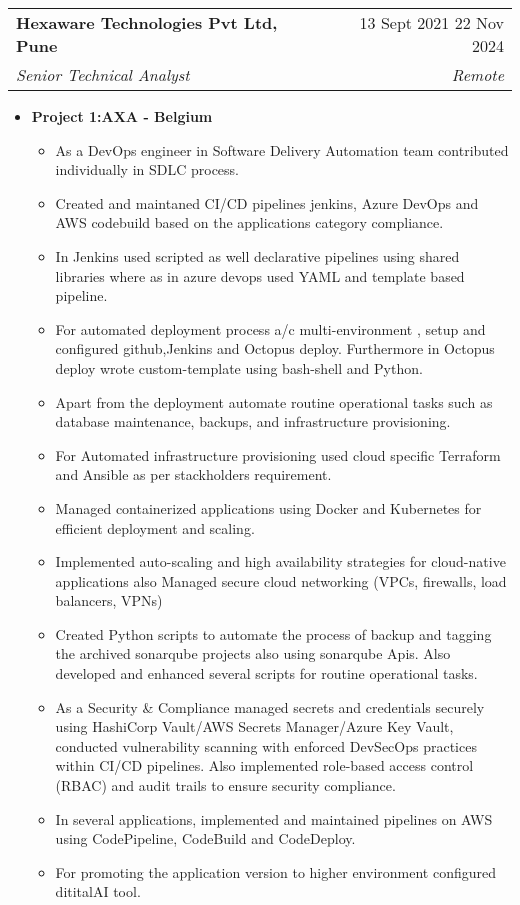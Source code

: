 \documentclass[letterpaper, 11pt]{article}
\makeatletter
\newcommand{\resumeSubheading}[4]{
  \vspace{-2pt}\item
    \begin{tabular*}{0.99\textwidth}[t]{l@{\extracolsep{\fill}}r}
      \textbf{#1} & #2 \\
      \textit{\small#3} & \textit{\small #4} \\
    \end{tabular*}\vspace{-7pt}
}
\newcommand{\resumeItemListStart}{\begin{itemize}[leftmargin=0.25in, label={\textbullet}]}
\newcommand{\resumeItemListEnd}{\end{itemize}\vspace{-10pt}}
\makeatother
\begin{document}
    \resumeSubheading{Hexaware Technologies Pvt Ltd, Pune}{ 13 Sept 2021 \textendash{} 22 Nov 2024}
        {Senior Technical Analyst }{Remote}
        \resumeItemListStart{}
            \item[] \textbf{Project 1:AXA - Belgium}
            \begin{itemize}[leftmargin=0.5in, label={\textbullet}]
                \item As a DevOps engineer in Software Delivery Automation team contributed individually in SDLC process.
                \item Created and maintaned CI/CD pipelines jenkins, Azure DevOps and AWS codebuild based on the applications category compliance.
                \item In Jenkins used scripted as well declarative pipelines using shared libraries where as in azure devops used YAML and template
                 based pipeline.
                \item For automated deployment process a/c multi-environment , setup and configured github,Jenkins and Octopus deploy. Furthermore 
                in Octopus deploy wrote custom-template using bash-shell and  Python.
                \item Apart from the deployment  automate routine operational tasks such as database maintenance, backups, and infrastructure provisioning.
                \item For  Automated infrastructure provisioning used cloud specific Terraform and  Ansible as per stackholders requirement.
                \item Managed containerized applications using Docker and Kubernetes for efficient deployment and scaling.
                \item Implemented auto-scaling and high availability strategies for cloud-native applications also Managed secure cloud networking 
                (VPCs, firewalls, load balancers, VPNs)
                \item Created Python scripts to automate the process of backup and tagging the archived sonarqube projects also using sonarqube Apis.
                Also developed and enhanced several scripts for routine operational tasks.
                \item As a Security & Compliance managed secrets and credentials securely using HashiCorp Vault/AWS Secrets Manager/Azure Key Vault,
                conducted vulnerability scanning with enforced DevSecOps practices within CI/CD pipelines. Also implemented role-based access control (RBAC)
                 and audit trails to ensure security compliance.
                 \item In several applications, implemented and maintained pipelines on AWS using CodePipeline, CodeBuild and CodeDeploy.
                 \item For promoting the application version to higher environment configured dititalAI tool.


            \end{itemize}
        \resumeItemListEnd{}
        
\end{document}
